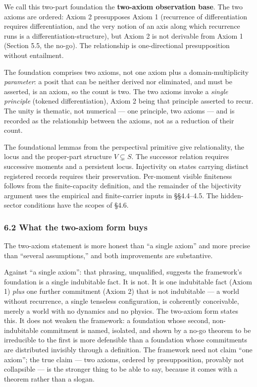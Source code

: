 \documentclass[
]{article}
\begin{document}
We call this two-part foundation the \textbf{two-axiom observation
base}. The two axioms are ordered: Axiom 2 presupposes Axiom 1
(recurrence of differentiation requires differentiation, and the very
notion of an axis along which recurrence runs is a
differentiation-structure), but Axiom 2 is not derivable from Axiom 1
(Section 5.5, the no-go). The relationship is one-directional
presupposition without entailment.

The foundation comprises two axioms, not one axiom plus a
domain-multiplicity \emph{parameter}: a posit that can be neither
derived nor eliminated, and must be asserted, is an axiom, so the count
is two. The two axioms invoke a \emph{single principle} (tokened
differentiation), Axiom 2 being that principle asserted to recur. The
unity is thematic, not numerical --- one principle, two axioms --- and
is recorded as the relationship between the axioms, not as a reduction
of their count.

The foundational lemmas from the perspectival primitive give
relationality, the locus and the proper-part structure
\(V \subsetneq S\). The successor relation requires successive moments
and a persistent locus. Injectivity on states carrying distinct
registered records requires their preservation. Per-moment visible
finiteness follows from the finite-capacity definition, and the
remainder of the bijectivity argument uses the empirical and
finite-carrier inputs in §§4.4--4.5. The hidden-sector conditions have
the scopes of §4.6.

\hypertarget{what-the-two-axiom-form-buys}{%
\subsubsection{6.2 What the two-axiom form
buys}\label{what-the-two-axiom-form-buys}}

The two-axiom statement is more honest than ``a single axiom'' and more
precise than ``several assumptions,'' and both improvements are
substantive.

Against ``a single axiom'': that phrasing, unqualified, suggests the
framework's foundation is a single indubitable fact. It is not. It is
one indubitable fact (Axiom 1) \emph{plus} one further commitment (Axiom
2) that is not indubitable --- a world without recurrence, a single
tenseless configuration, is coherently conceivable, merely a world with
no dynamics and no physics. The two-axiom form states this. It does not
weaken the framework: a foundation whose second, non-indubitable
commitment is named, isolated, and shown by a no-go theorem to be
irreducible to the first is more defensible than a foundation whose
commitments are distributed invisibly through a definition. The
framework need not claim ``one axiom''; the true claim --- two axioms,
ordered by presupposition, provably not collapsible --- is the stronger
thing to be able to say, because it comes with a theorem rather than a
slogan.
\end{document}
